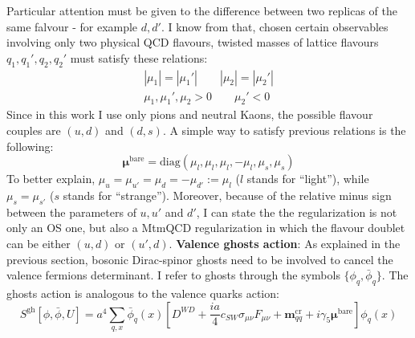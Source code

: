 \documentclass[english, LaM, oneside, noexaminfo]{sapthesis}
\newcommand{\bare}{^{\text{bare}}}
\begin{document}
Particular attention must be given to the difference between two replicas of the same falvour - for example $d,d'$.
I know from \cite{FR2} that, chosen certain observables involving only two physical QCD flavours, twisted masses of lattice flavours $q_1,q_1',q_2,q_2'$ must satisfy these relations:
\begin{equation*}
    \begin{gathered}
        |\mu_1| = |\mu_1 '| \qquad |\mu_2| = |\mu_2 '| \\
        \mu_1, \mu_1 ', \mu_2 > 0 \qquad \mu_2 '<0
    \end{gathered}
\end{equation*}
Since in this work I use only pions and neutral Kaons, the possible flavour couples are $(u,d)$ and $(d,s)$.
A simple way to satisfy previous relations is the following:
\begin{equation*}
    \boldsymbol{\mu}\bare = \text{diag}\left(\mu_l,\mu_l,\mu_l,-\mu_l,\mu_s,\mu_s\right)
\end{equation*}
To better explain, $\mu_u = \mu_{u'} = \mu_d = -\mu_{d'} := \mu_l$ ($l$ stands for ``light''), while $\mu_s = \mu_{s'}$ ($s$ stands for ``strange'').
Moreover, because of the relative minus sign between the parameters of $u,u'$ and $d'$, I can state the the regularization is not only an OS one, but also a MtmQCD regularization in which the flavour doublet can be either $(u,d)$ or $(u',d)$.
\newline\newline
{\bf Valence ghosts action}:
As explained in the previous section, bosonic Dirac-spinor ghosts need to be involved to cancel the valence fermions determinant.
I refer to ghosts through the symbols $\{\phi_q,\bar\phi_q\}$.
The ghosts action is analogous to the valence quarks action:
\begin{equation}\label{eq:ghost-action}
    S^{\text{gh}}[\phi, \bar\phi, U] = a^4 \sum_{q,x} \bar \phi_q (x) \left[ D^{WD} + \frac{ia}{4}c_{SW}\sigma_{\mu\nu}\hat F_{\mu\nu} + \boldsymbol{m}^\text{cr}_{qq} + i\gamma_5\boldsymbol{\mu}\bare \right] \phi_q (x)
\end{equation}
\end{document}
